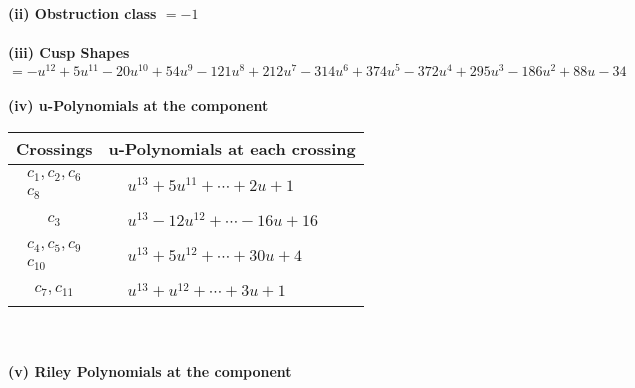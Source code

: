 \documentclass[1p]{elsarticle_modified}
\theoremstyle{definition}
\begin{document}
\flushleft \textbf{(ii) Obstruction class $= -1$}\\~\\
\flushleft \textbf{(iii) Cusp Shapes $= - u^{12}+5 u^{11}-20 u^{10}+54 u^9-121 u^8+212 u^7-314 u^6+374 u^5-372 u^4+295 u^3-186 u^2+88 u-34$}\\~\\
\newpage\renewcommand{\arraystretch}{1}
\flushleft \textbf{(iv) u-Polynomials at the component}\newline \\
\begin{tabular}{m{50pt}|m{274pt}}
Crossings & \hspace{64pt}u-Polynomials at each crossing \\
\hline $$\begin{aligned}c_{1},c_{2},c_{6}\\c_{8}\end{aligned}$$&$\begin{aligned}
&u^{13}+5 u^{11}+\cdots+2 u+1
\end{aligned}$\\
\hline $$\begin{aligned}c_{3}\end{aligned}$$&$\begin{aligned}
&u^{13}-12 u^{12}+\cdots-16 u+16
\end{aligned}$\\
\hline $$\begin{aligned}c_{4},c_{5},c_{9}\\c_{10}\end{aligned}$$&$\begin{aligned}
&u^{13}+5 u^{12}+\cdots+30 u+4
\end{aligned}$\\
\hline $$\begin{aligned}c_{7},c_{11}\end{aligned}$$&$\begin{aligned}
&u^{13}+u^{12}+\cdots+3 u+1
\end{aligned}$\\
\hline
\end{tabular}\\~\\
\newpage\renewcommand{\arraystretch}{1}
\flushleft \textbf{(v) Riley Polynomials at the component}\newline \\
\end{document}
